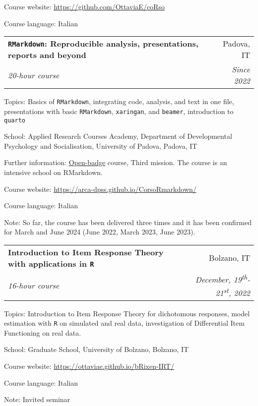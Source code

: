 \documentclass[letterpaper,12pt]{article}
\makeatletter
\newcommand{\resumeSubheading}[4]{
  \vspace{-1pt}\item
    \begin{tabular*}{0.97\textwidth}{l@{\extracolsep{\fill}}r}
      \textbf{#1} & #2 \\
      \textit{\small#3} & \textit{\small #4} \\
    \end{tabular*}\vspace{-5pt}
}
\makeatother
\begin{document}

{\small Course website:  \href{https://github.com/OttaviaE/coRso}{https://github.com/OttaviaE/coRso}} 

{\small Course language: Italian}


\resumeSubheading {\texttt{RMarkdown}: Reproducible analysis, presentations, reports and beyond}{Padova, IT}{20-hour course}{\small{Since 2022}}

{\small Topics: Basics of \texttt{RMarkdown}, integrating code, analysis, and text in one file, presentations with basic \texttt{RMarkdown}, \texttt{xaringan}, and \texttt{beamer}, introduction to \texttt{quarto}}

{\small School: Applied Research Courses Academy, Department of Developmental Psychology and Socialisation, University of Padova, Padova, IT} 

{\small Further information: \href{https://bestr.it/badge/show/3657}{Open-badge} course, Third mission. The course is an intensive school on RMarkdown.  } 

{\small Course website: \href{https://arca-dpss.github.io/CorsoRmarkdown/}{https://arca-dpss.github.io/CorsoRmarkdown/}}

{\small Course language: Italian}

{\small Note: So far, the course has been delivered three times and it has been confirmed for March and June 2024 (June 2022, March 2023, June 2023).}

\resumeSubheading {Introduction to Item Response Theory with applications in \texttt{R}}{Bolzano, IT}{16-hour course}{December, 19\textsuperscript{th}-21\textsuperscript{st}, 2022}

{\small Topics: Introduction to Item Response Theory for dichotomous responses, model estimation with \texttt{R} on simulated and real data, investigation of Differential Item Functioning on real data. }

{\small School: Graduate School, University of Bolzano, Bolzano, IT} 


{\small Course website:  \href{https://ottaviae.github.io/bRixen-IRT/}{https://ottaviae.github.io/bRixen-IRT/}} 

{\small Course language: Italian}

{\small Note: Invited seminar}
\end{document}
